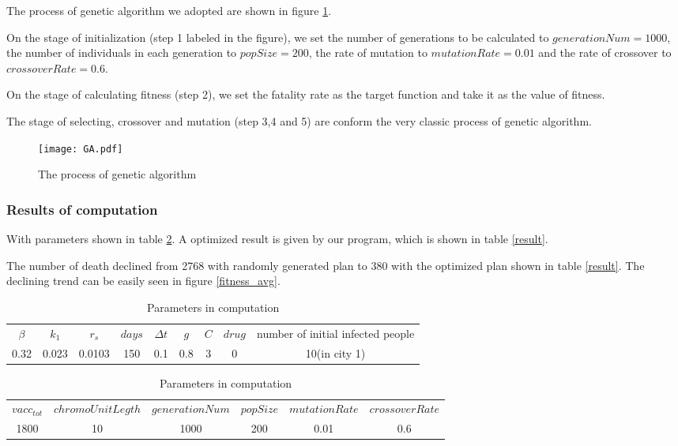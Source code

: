 The process of genetic algorithm we adopted are shown in figure \ref{GA}.

On the stage of initialization (step 1 labeled in the figure), we set the number of generations to be calculated to $generationNum = 1000$, the number of individuals in each generation to $popSize = 200$, the rate of mutation to $mutationRate = 0.01$ and the rate of crossover to $crossoverRate = 0.6$.

On the stage of calculating fitness (step 2), we set the fatality rate as the target function and take it as the value of fitness.

The stage of selecting, crossover and mutation (step 3,4 and 5) are conform the very classic process of genetic algorithm.

\begin{figure}
	\centering
	\texttt{[image: GA.pdf]}
	\caption{The process of genetic algorithm}
	\label{GA}
\end{figure}

\subsubsection{Results of computation}
With parameters shown in table \ref{comppara}. A optimized result is given by our program, which is shown in table \ref{result}.

The number of death declined from 2768 with randomly generated plan to 380 with the optimized plan shown in table \ref{result}. The declining trend can be easily seen in figure \ref{fitness_avg}.

\begin{table}[]
	\centering
	\begin{tabular}{ccccccccc}
		\hline
		$\beta$ & $k_1$ & $r_s$  & $days$ & $\Delta t$ & $g$ & $C$ & $drug$ & number of initial infected people \\
		0.32    & 0.023 & 0.0103 & 150    & 0.1        & 0.8 & 3   & 0      & 10(in city 1)                     \\
		\hline
	\end{tabular}
	\begin{tabular}{cccccc}
		\hline
		$vacc_{tot}$ & $chromoUnitLegth$ & $generationNum$ & $popSize$ & $mutationRate$ & $crossoverRate$ \\
		1800         & 10                & 1000            & 200       & 0.01           & 0.6             \\
		\hline
	\end{tabular}
	\caption{Parameters in computation}
	\label{comppara}
\end{table}

